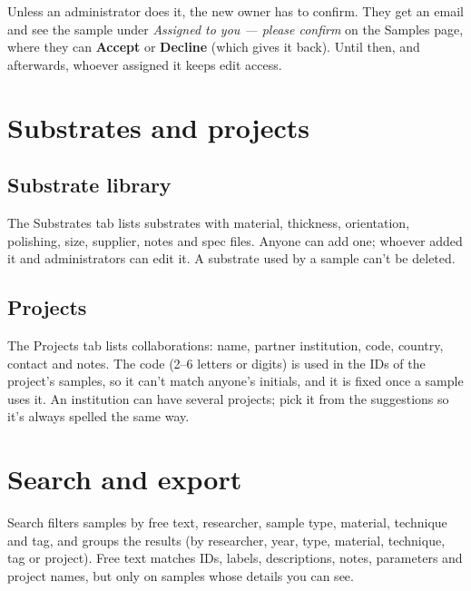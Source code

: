 \documentclass[11pt,a4paper]{article}
\newcommand{\ui}[1]{\textsf{\textbf{#1}}}
\newcommand{\menu}[1]{\textsf{#1}}
\begin{document}
Unless an administrator does it, the new owner has to confirm. They get
an email and see the sample under \emph{Assigned to you --- please confirm}
on the \menu{Samples} page, where they can \ui{Accept} or \ui{Decline} (which
gives it back). Until then, and afterwards, whoever assigned it keeps edit
access.

\section{Substrates and projects}

\subsection{Substrate library}

The \menu{Substrates} tab lists substrates with material, thickness,
orientation, polishing, size, supplier, notes and spec files. Anyone can
add one; whoever added it and administrators can edit it. A substrate used
by a sample can't be deleted.

\subsection{Projects}

The \menu{Projects} tab lists collaborations: name, partner institution,
code, country, contact and notes. The code (2--6 letters or digits) is used
in the IDs of the project's samples, so it can't match anyone's initials,
and it is fixed once a sample uses it. An institution can have several
projects; pick it from the suggestions so it's always spelled the same way.

\section{Search and export}

\menu{Search} filters samples by free text, researcher, sample type,
material, technique and tag, and groups the results (by
researcher, year, type, material, technique, tag or project). Free text
matches IDs, labels, descriptions, notes, parameters and project names, but only on
samples whose details you can see.
\end{document}

